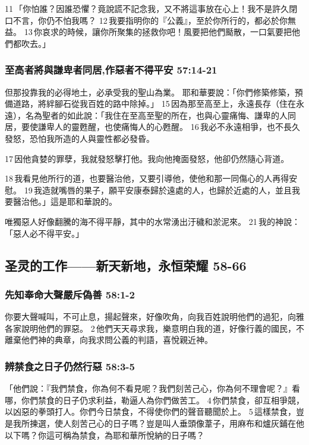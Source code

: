 11 「你怕誰？因誰恐懼？竟說謊不記念我，又不將這事放在心上！我不是許久閉口不言，你仍不怕我嗎？ 12 我要指明你的『公義』，至於你所行的，都必於你無益。 13 你哀求的時候，讓你所聚集的拯救你吧！風要把他們颳散，一口氣要把他們都吹去。」

\subsubsection{至高者將與謙卑者同居,作惡者不得平安 57:14-21}
但那投靠我的必得地土，必承受我的聖山為業。
耶和華要說：「你們修築修築，預備道路，將絆腳石從我百姓的路中除掉。」 15 因為那至高至上，永遠長存（住在永遠），名為聖者的如此說：「我住在至高至聖的所在，也與心靈痛悔、謙卑的人同居，要使謙卑人的靈甦醒，也使痛悔人的心甦醒。 16 我必不永遠相爭，也不長久發怒，恐怕我所造的人與靈性都必發昏。 

17 因他貪婪的罪孽，我就發怒擊打他。我向他掩面發怒，他卻仍然隨心背道。 

18 我看見他所行的道，也要醫治他，又要引導他，使他和那一同傷心的人再得安慰。 19 我造就嘴唇的果子，願平安康泰歸於遠處的人，也歸於近處的人，並且我要醫治他。」這是耶和華說的。

唯獨惡人好像翻騰的海不得平靜，其中的水常湧出汙穢和淤泥來。 21 我的神說：「惡人必不得平安。」

\subsection{圣灵的工作——新天新地，永恒荣耀 58-66}
\subsubsection{先知奉命大聲嚴斥偽善 58:1-2}
你要大聲喊叫，不可止息，揚起聲來，好像吹角，向我百姓說明他們的過犯，向雅各家說明他們的罪惡。 2 他們天天尋求我，樂意明白我的道，好像行義的國民，不離棄他們神的典章，向我求問公義的判語，喜悅親近神。

\subsubsection{辨禁食之日子仍然行惡 58:3-5}
「他們說：『我們禁食，你為何不看見呢？我們刻苦己心，你為何不理會呢？』看哪，你們禁食的日子仍求利益，勒逼人為你們做苦工。 4 你們禁食，卻互相爭競，以凶惡的拳頭打人。你們今日禁食，不得使你們的聲音聽聞於上。 5 這樣禁食，豈是我所揀選，使人刻苦己心的日子嗎？豈是叫人垂頭像葦子，用麻布和爐灰鋪在他以下嗎？你這可稱為禁食，為耶和華所悅納的日子嗎？ 

